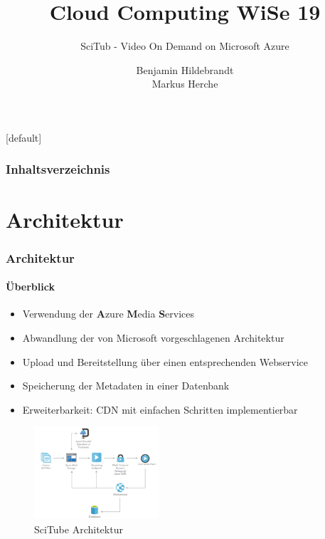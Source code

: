 \documentclass[aspectratio=169]{beamer}
\title[Cloud Computing]{Cloud Computing WiSe 19}
\subtitle{SciTub - Video On Demand on Microsoft Azure}
\author[Hildebrandt, Herche]{Benjamin Hildebrandt \\ Markus Herche}
\institute{Fachbereich Angewandte Informatik\\Hochschule Fulda -- University of Applied Sciences}
\begin{document}
\begingroup
{}[default]
\begin{frame}[plain]
  \titlepage
\end{frame}
\endgroup

\begin{frame}
  \frametitle{Inhaltsverzeichnis}
  \tableofcontents
\end{frame}

\section{Architektur}
\begin{frame}
  \frametitle{Architektur}
  \framesubtitle{Überblick}
  \begin{minipage}{.45\textwidth}
    \begin{itemize}
      \item Verwendung der \textbf{A}zure \textbf{M}edia \textbf{S}ervices
      \item Abwandlung der von Microsoft vorgeschlagenen Architektur
      \item Upload und Bereitstellung über einen entsprechenden Webservice
      \item Speicherung der Metadaten in einer Datenbank
      \item Erweiterbarkeit: CDN mit einfachen Schritten implementierbar
    \end{itemize}
  \end{minipage}
  \begin{minipage}{.5\textwidth}
    \begin{figure}[H]
      \includegraphics[height=130px]{img/architecture_new.png}
      \caption{SciTube Architektur}
      \label{fig:arch_new}
    \end{figure}
  \end{minipage}
\end{frame}
\end{document}
